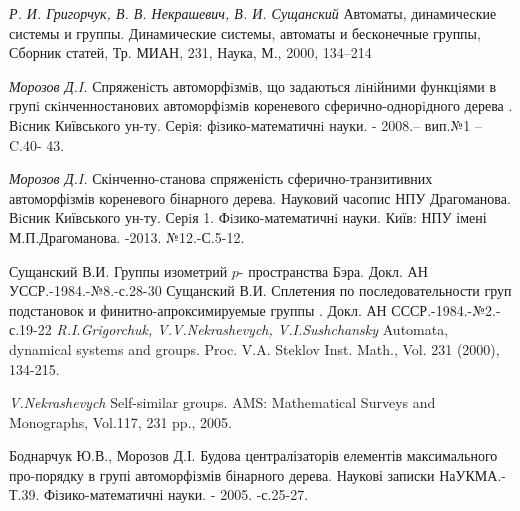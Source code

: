 \documentclass[a4paper,12pt]{article} \usepackage{a4wide}
\numberwithin{equation}{subsection}
\begin{document}
    \begin{thebibliography}{100}



 {\it Р. И. Григорчук, В. В. Некрашевич, В. И. Сущанский} Автоматы, динамические системы и группы.
 Динамические системы, автоматы и бесконечные группы, Сборник статей, Тр. МИАН, 231, Наука, М., 2000, 134–214 

 {\it Морозов Д.I.}  Спряженiсть автоморфiзмiв, що
  задаються лiнiйними функцiями в групi скiнченностанових
  автоморфiзмiв кореневого сферично-однорiдного дерева . Вiсник
  Київського ун-ту. Серiя: фiзико-математичнi науки. - 2008.– вип.№1
  –C.40- 43.

 {\it Морозов Д.I.}  Скінченно-станова спряженість сферично-транзитивних автоморфізмів кореневого бінарного дерева. Науковий часопис НПУ Драгоманова. Вiсник
  Київського ун-ту. Серiя 1. Фiзико-математичнi науки. Київ: НПУ імені М.П.Драгоманова. -2013. №12.-С.5-12.



   {Сущанский В.И. Группы изометрий $p$- пространства Бэра. Докл. АН УССР.-1984.-№8.-с.28-30   }
   { Сущанский В.И. Сплетения по последовательности груп подстановок
 и финитно-апроксимируемые группы . Докл. АН СССР.-1984.-№2.-с.19-22   }
{\em R.I.Grigorchuk, V.V.Nekrashevych, V.I.Sushchansky} Automata,
dynamical systems and groups. Proc. V.A. Steklov Inst. Math., Vol.
231 (2000), 134-215.

{\em V.Nekrashevych} Self-similar groups. AMS: Mathematical
Surveys and Monographs, Vol.117, 231 pp., 2005.

 {Боднарчук Ю.В., Морозов Д.І. Будова централізаторів елементів максимального про-порядку в групі
 автоморфізмів бінарного дерева. Наукові  записки НаУКМА.- Т.39. Фізико-математичні науки. - 2005. -с.25-27.}


\end{thebibliography}
\end{document}
